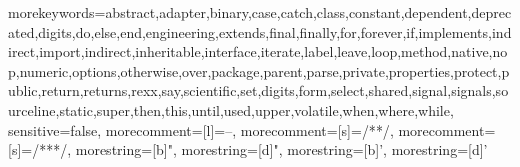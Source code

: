 {morekeywords={abstract,adapter,binary,case,catch,class,constant,dependent,deprecated,digits,do,else,end,engineering,extends,final,finally,for,forever,if,implements,indirect,import,indirect,inheritable,interface,iterate,label,leave,loop,method,native,nop,numeric,options,otherwise,over,package,parent,parse,private,properties,protect,public,return,returns,rexx,say,scientific,set,digits,form,select,shared,signal,signals,sourceline,static,super,then,this,until,used,upper,volatile,when,where,while},
sensitive=false,
morecomment=[l]={--},
morecomment=[s]={/*}{*/},
morecomment=[s]={/**}{*/},
morestring=[b]",
morestring=[d]",
morestring=[b]',
morestring=[d]'}

